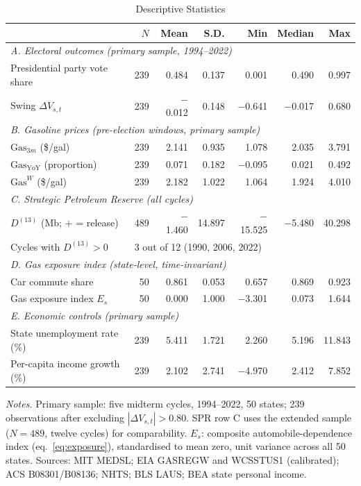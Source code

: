 \documentclass[12pt]{article}
\begin{document}
\begin{table}[!htbp]
\centering
\caption{Descriptive Statistics}
\label{tab:summary}
\begin{threeparttable}
\small
\begin{tabular}{lrrrrrr}
\toprule
 & $N$ & Mean & S.D. & Min & Median & Max \\
\midrule
\multicolumn{7}{l}{\textit{A. Electoral outcomes (primary sample, 1994--2022)}} \\[2pt]
Presidential party vote share & 239 & 0.484 & 0.137 & 0.001 & 0.490 & 0.997 \\
Swing $\Delta V_{s,t}$ & 239 & $-$0.012 & 0.148 & $-$0.641 & $-$0.017 & 0.680 \\[4pt]
\multicolumn{7}{l}{\textit{B. Gasoline prices (pre-election windows, primary sample)}} \\[2pt]
$\mathrm{Gas}_{3m}$ (\$/gal) & 239 & 2.141 & 0.935 & 1.078 & 2.035 & 3.791 \\
$\mathrm{Gas}_{\mathrm{YoY}}$ (proportion) & 239 & 0.071 & 0.182 & $-$0.095 & 0.021 & 0.492 \\
$\mathrm{Gas}^W$ (\$/gal) & 239 & 2.182 & 1.022 & 1.064 & 1.924 & 4.010 \\[4pt]
\multicolumn{7}{l}{\textit{C. Strategic Petroleum Reserve (all cycles)}} \\[2pt]
$D^{(13)}$ (Mb; $+$ = release) & 489 & $-$1.460 & 14.897 & $-$15.525 & $-$5.480 & 40.298 \\
Cycles with $D^{(13)}>0$ & \multicolumn{6}{l}{3 out of 12 (1990, 2006, 2022)} \\[4pt]
\multicolumn{7}{l}{\textit{D. Gas exposure index (state-level, time-invariant)}} \\[2pt]
Car commute share & 50 & 0.861 & 0.053 & 0.657 & 0.869 & 0.923 \\
Gas exposure index $E_s$ & 50 & 0.000 & 1.000 & $-$3.301 & 0.073 & 1.644 \\[4pt]
\multicolumn{7}{l}{\textit{E. Economic controls (primary sample)}} \\[2pt]
State unemployment rate (\%) & 239 & 5.411 & 1.721 & 2.260 & 5.196 & 11.843 \\
Per-capita income growth (\%) & 239 & 2.102 & 2.741 & $-$4.970 & 2.412 & 7.852 \\
\bottomrule
\end{tabular}
\begin{tablenotes}
\footnotesize
\item \textit{Notes.} Primary sample: five midterm cycles, 1994--2022, 50 states; 239 observations after excluding $|\Delta V_{s,t}|>0.80$. SPR row C uses the extended sample ($N=489$, twelve cycles) for comparability. $E_s$: composite automobile-dependence index (eq.~\ref{eq:exposure}), standardised to mean zero, unit variance across all 50 states. Sources: MIT MEDSL; EIA GASREGW and WCSSTUS1 (calibrated); ACS B08301/B08136; NHTS; BLS LAUS; BEA state personal income.
\end{tablenotes}
\end{threeparttable}
\end{table}
\end{document}
